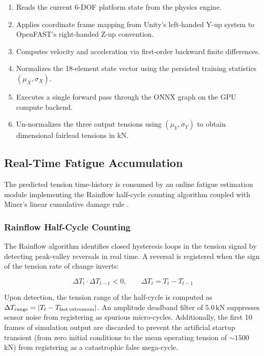 \documentclass[preprint,12pt]{elsarticle}
\begin{document}
\begin{enumerate}
    \item Reads the current 6-DOF platform state from the physics engine.
    \item Applies coordinate frame mapping from Unity's left-handed Y-up system to OpenFAST's right-handed Z-up convention.
    \item Computes velocity and acceleration via first-order backward finite differences.
    \item Normalizes the 18-element state vector using the persisted training statistics $(\mu_X, \sigma_X)$.
    \item Executes a single forward pass through the ONNX graph on the GPU compute backend.
    \item Un-normalizes the three output tensions using $(\mu_Y, \sigma_Y)$ to obtain dimensional fairlead tensions in kN.
\end{enumerate}

\subsection{Real-Time Fatigue Accumulation}
\label{sec:fatigue}

The predicted tension time-history is consumed by an online fatigue estimation module implementing the Rainflow half-cycle counting algorithm \cite{matsuishi1968fatigue, astm2017rainflow} coupled with Miner's linear cumulative damage rule \cite{miner1945cumulative}.

\subsubsection{Rainflow Half-Cycle Counting}

The Rainflow algorithm identifies closed hysteresis loops in the tension signal by detecting peak-valley reversals in real time. A reversal is registered when the sign of the tension rate of change inverts:

\begin{equation}
\label{eq:reversal}
    \Delta T_t \cdot \Delta T_{t-1} < 0, \qquad \Delta T_t = T_t - T_{t-1}
\end{equation}

Upon detection, the tension range of the half-cycle is computed as $\Delta T_{\text{range}} = |T_t - T_{\text{last\,extremum}}|$. An amplitude deadband filter of 5.0\,kN suppresses sensor noise from registering as spurious micro-cycles. Additionally, the first 10 frames of simulation output are discarded to prevent the artificial startup transient (from zero initial conditions to the mean operating tension of ${\sim}1500$\,kN) from registering as a catastrophic false mega-cycle.
\end{document}
